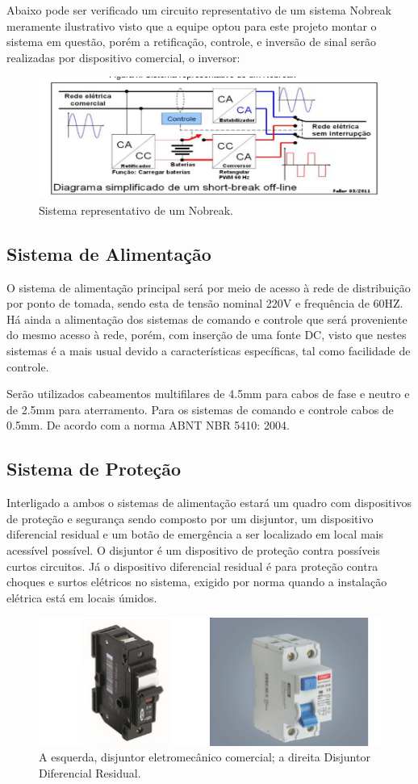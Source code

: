 			Abaixo pode ser verificado um circuito representativo de um sistema Nobreak meramente ilustrativo visto que a equipe optou para este projeto montar o sistema em questão, porém a retificação, controle, e inversão de sinal serão realizadas por dispositivo comercial, o inversor: 


			\begin{figure}[H]
				\centering
				\includegraphics[scale= 0.7]{figuras/nobreak.png}
				\caption{Sistema representativo de um Nobreak.}
				\label{nobreak}
			\end{figure}		

		\subsection[Sistema de Alimentação]{Sistema de Alimentação}
			O sistema de alimentação principal será por meio de acesso à rede de distribuição por ponto de tomada, sendo esta de tensão nominal 220V e frequência de 60HZ. Há ainda a alimentação dos sistemas de comando e controle que será proveniente do mesmo acesso à rede, porém,  com inserção de uma fonte DC, visto que nestes sistemas é a mais usual devido a características específicas, tal como facilidade de controle.
			
			Serão utilizados cabeamentos multifilares de 4.5mm para cabos de fase e neutro e de 2.5mm para aterramento. Para os sistemas de comando e controle cabos de 0.5mm. De acordo com a norma ABNT NBR 5410: 2004.

		\subsection[Sistema de Proteção]{Sistema de Proteção}
			Interligado a ambos o sistemas de alimentação estará um quadro com dispositivos de proteção e segurança sendo composto por um disjuntor, um dispositivo diferencial residual e um botão de emergência a ser localizado em local mais acessível possível. O disjuntor é um dispositivo de proteção contra possíveis curtos circuitos. Já o dispositivo diferencial residual é para proteção contra choques e surtos elétricos no sistema, exigido por norma quando a instalação elétrica está em locais úmidos. 

			\begin{figure}[H]
				\centering
				\includegraphics[scale= 0.7]{figuras/disjuntor.png}
				\caption{ A esquerda, disjuntor eletromecânico comercial; a direita Disjuntor Diferencial Residual.}
				\label{disjuntor}
			\end{figure}		